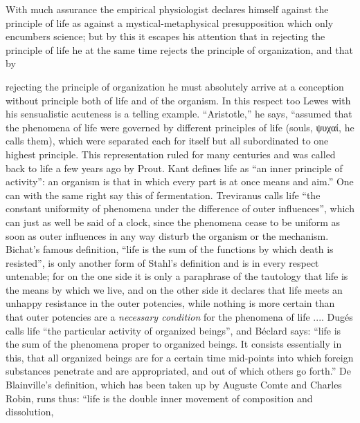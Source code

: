 \documentclass[12pt,a4paper]{book}
\begin{document}
With much assurance the empirical physiologist declares himself against the
principle of life as against a mystical-metaphysical presupposition which only
encumbers science; but by this it escapes his attention that in rejecting the
principle of life he at the same time rejects the principle of organization, and
that by

rejecting the principle of organization he must absolutely arrive at a conception
without principle both of life and of the organism. In this respect too Lewes with
his sensualistic acuteness is a telling example. ``Aristotle,'' he says, ``assumed
that the phenomena of life were governed by different principles of life (souls,
ψυχαί, he calls them), which were separated each for itself but all subordinated to
one highest principle. This representation ruled for many centuries and was called
back to life a few years ago by Prout. Kant defines life as ``an inner principle of
activity'': an organism is that in which every part is at once means and aim.'' One
can with the same right say this of fermentation. Treviranus calls life ``the
constant uniformity of phenomena under the difference of outer influences'', which
can just as well be said of a clock, since the phenomena cease to be uniform as
soon as outer influences in any way disturb the organism or the mechanism. Bichat's
famous definition, ``life is the sum of the functions by which death is resisted'',
is only another form of Stahl's definition and is in every respect untenable; for
on the one side it is only a paraphrase of the tautology that life is the means by
which we live, and on the other side it declares that life meets an unhappy
resistance in the outer potencies, while nothing is more certain than that outer
potencies are a \emph{necessary condition} for the phenomena of life .... Dugés
calls life ``the particular activity of organized beings'', and Béclard says: ``life
is the sum of the phenomena proper to organized beings. It consists essentially in
this, that all organized beings are for a certain time mid-points into which
foreign substances penetrate and are appropriated, and out of which others go
forth.'' De Blainville's definition, which has been taken up by Auguste Comte and
Charles Robin, runs thus: ``life is the double inner movement of composition and
dissolution,
\end{document}

